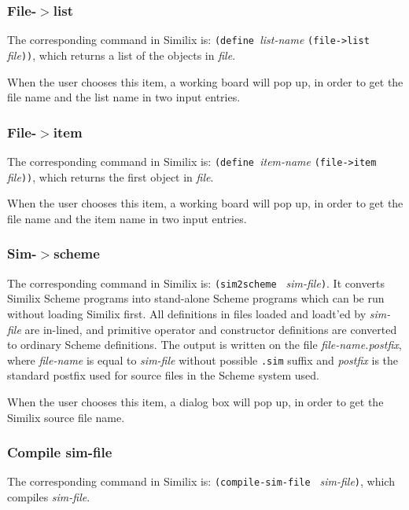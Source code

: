\begin{sloppypar}
\subsubsection{File-$>$list}


The corresponding command in Similix is: {\tt (define }{\it list-name
}{\tt (file->list }{\it file}{\tt ))}, which returns a list of the
objects in {\it file}.
   
When the user chooses this item, a working board will pop up, in order
to get the file name and the list name in two input entries.



\subsubsection{File-$>$item}


The corresponding command in Similix is: {\tt (define }{\it item-name
}{\tt (file->item }{\it file}{\tt ))}, which returns the first object
in {\it file}.
   
When the user chooses this item, a working board will pop up, in order
to get the file name and the item name in two input entries.



\subsubsection{Sim-$>$scheme}


The corresponding command in Similix is: {\tt (sim2scheme }{\it
sim-file}{\tt )}. It converts Similix Scheme programs into stand-alone
Scheme programs which can be run without loading Similix first.  All
definitions in files loaded and loadt'ed by {\it sim-file} are
in-lined, and primitive operator and constructor definitions are
converted to ordinary Scheme definitions. The output is written on the
file {\it file-name.postfix}, where {\it file-name} is equal to {\it
sim-file} without possible {\tt .sim} suffix and {\it postfix} is the
standard postfix used for source files in the Scheme system used.
   
When the user chooses this item, a dialog box will pop up, in order to
get the Similix source file name.


\subsubsection{Compile sim-file}


The corresponding command in Similix is: {\tt (compile-sim-file }{\it
sim-file}{\tt )}, which compiles {\it sim-file}.
   

\end{sloppypar}
